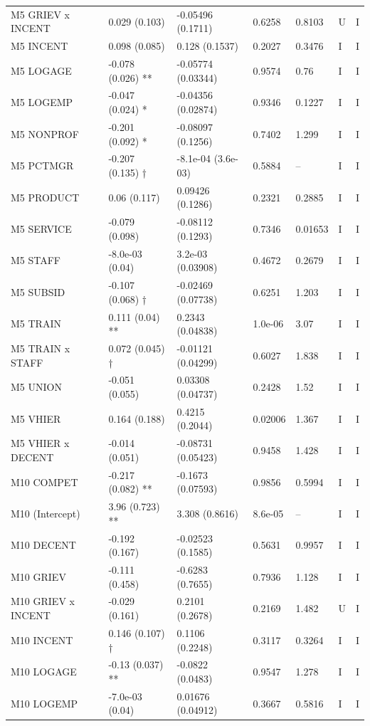 {\begin{longtable}{@{}p{.245\linewidth}p{.17\linewidth}p{.17\linewidth}p{.085\linewidth}p{.060\linewidth}p{.08\linewidth}p{.07\linewidth}@{}}
M5 GRIEV x INCENT & 0.029 (0.103) & -0.05496 (0.1711) & 0.6258 & 0.8103 & U & I\\
M5 INCENT & 0.098 (0.085) & 0.128 (0.1537) & 0.2027 & 0.3476 & I & I\\
M5 LOGAGE & -0.078 (0.026) ** & -0.05774 (0.03344) & 0.9574 & 0.76 & I & I\\
M5 LOGEMP & -0.047 (0.024) * & -0.04356 (0.02874) & 0.9346 & 0.1227 & I & I\\
M5 NONPROF & -0.201 (0.092) * & -0.08097 (0.1256) & 0.7402 & 1.299 & I & I\\
M5 PCTMGR & -0.207 (0.135) † & -8.1e-04 (3.6e-03) & 0.5884 & -- & I & I\\
M5 PRODUCT & 0.06 (0.117) & 0.09426 (0.1286) & 0.2321 & 0.2885 & I & I\\
M5 SERVICE & -0.079 (0.098) & -0.08112 (0.1293) & 0.7346 & 0.01653 & I & I\\
M5 STAFF & -8.0e-03 (0.04) & 3.2e-03 (0.03908) & 0.4672 & 0.2679 & I & I\\
M5 SUBSID & -0.107 (0.068) † & -0.02469 (0.07738) & 0.6251 & 1.203 & I & I\\
M5 TRAIN & 0.111 (0.04) ** & 0.2343 (0.04838) & 1.0e-06 & 3.07 & I & I\\
M5 TRAIN x STAFF & 0.072 (0.045) † & -0.01121 (0.04299) & 0.6027 & 1.838 & I & I\\
M5 UNION & -0.051 (0.055) & 0.03308 (0.04737) & 0.2428 & 1.52 & I & I\\
M5 VHIER & 0.164 (0.188) & 0.4215 (0.2044) & 0.02006 & 1.367 & I & I\\
M5 VHIER x DECENT & -0.014 (0.051) & -0.08731 (0.05423) & 0.9458 & 1.428 & I & I\\
M10 COMPET & -0.217 (0.082) ** & -0.1673 (0.07593) & 0.9856 & 0.5994 & I & I\\
M10 (Intercept) & 3.96 (0.723) ** & 3.308 (0.8616) & 8.6e-05 & -- & I & I\\
M10 DECENT & -0.192 (0.167) & -0.02523 (0.1585) & 0.5631 & 0.9957 & I & I\\
M10 GRIEV & -0.111 (0.458) & -0.6283 (0.7655) & 0.7936 & 1.128 & I & I\\
M10 GRIEV x INCENT & -0.029 (0.161) & 0.2101 (0.2678) & 0.2169 & 1.482 & U & I\\
M10 INCENT & 0.146 (0.107) † & 0.1106 (0.2248) & 0.3117 & 0.3264 & I & I\\
M10 LOGAGE & -0.13 (0.037) ** & -0.0822 (0.0483) & 0.9547 & 1.278 & I & I\\
M10 LOGEMP & -7.0e-03 (0.04) & 0.01676 (0.04912) & 0.3667 & 0.5816 & I & I\\

\end{longtable}}
